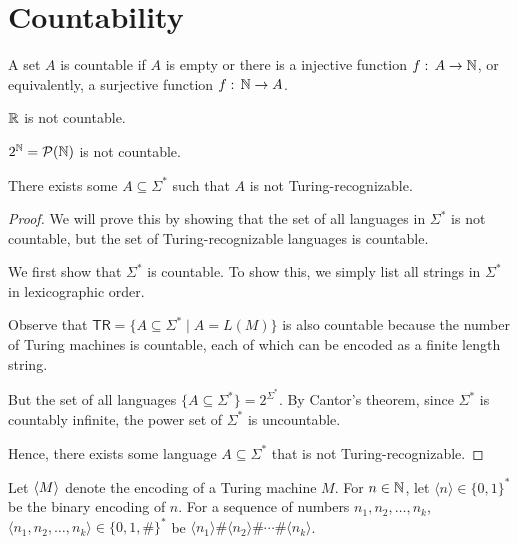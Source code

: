 \section{Countability}

\vspace{\parskip}

\begin{definition}
    A set $A$ is countable if $A$ is empty or there is a injective function $f:\, A \to \mathbb{N}$, or equivalently, a surjective function $f:\, \mathbb{N} \to A$.
\end{definition}

\begin{theorem}
    $\mathbb{R}$ is not countable.
\end{theorem}

\begin{theorem}
    $2^{\mathbb{N}} = \mathcal{P}(\mathbb{N})$ is not countable.
\end{theorem}

\begin{corollary}
    There exists some $A \subseteq \Sigma^*$ such that $A$ is not Turing-recognizable.
\end{corollary}

\begin{proof}
    We will prove this by showing that the set of all languages in $\Sigma^*$ is not countable, but the set of Turing-recognizable languages is countable.

    We first show that $\Sigma^*$ is countable. To show this, we simply list all strings in $\Sigma^*$ in lexicographic order.

    Observe that $\mathsf{TR} = \{ A \subseteq \Sigma^* \mid A = L(M) \}$ is also countable because the number of Turing machines is countable, each of which can be encoded as a finite length string.

    But the set of all languages $\{ A \subseteq \Sigma^* \} = 2^{\Sigma^*}$. By Cantor's theorem, since $\Sigma^*$ is countably infinite, the power set of $\Sigma^*$ is uncountable.

    Hence, there exists some language $A \subseteq \Sigma^*$ that is not Turing-recognizable.
\end{proof}

Let $\langle M \rangle$ denote the encoding of a Turing machine $M$. For $n \in \mathbb{N}$, let $\langle n \rangle \in \{0,1\}^*$ be the binary encoding of $n$. For a sequence of numbers $n_1,n_2,\ldots,n_k$, $\langle n_1,n_2,\ldots,n_k \rangle \in \{0,1,\#\}^*$ be $\langle n_1 \rangle \# \langle n_2 \rangle \# \cdots \# \langle n_k \rangle$.


